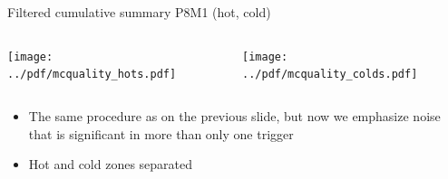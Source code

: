 \documentclass[9pt]{beamer}
\begin{document}
\begin{frame}[t]{Filtered cumulative summary P8M1 (hot, cold)}
\begin{columns}[T]
  \begin{column}{.5\textwidth}
  \texttt{[image: ../pdf/mcquality\_hots.pdf]}
  \end{column}
  \begin{column}{.5\textwidth}
  \texttt{[image: ../pdf/mcquality\_colds.pdf]}
  \end{column}
\end{columns}
\begin{itemize}
 \item The same procedure as on the previous slide, but now we emphasize noise that is significant in more than only one trigger
 \item Hot and cold zones separated
\end{itemize}
\end{frame}
\end{document}
